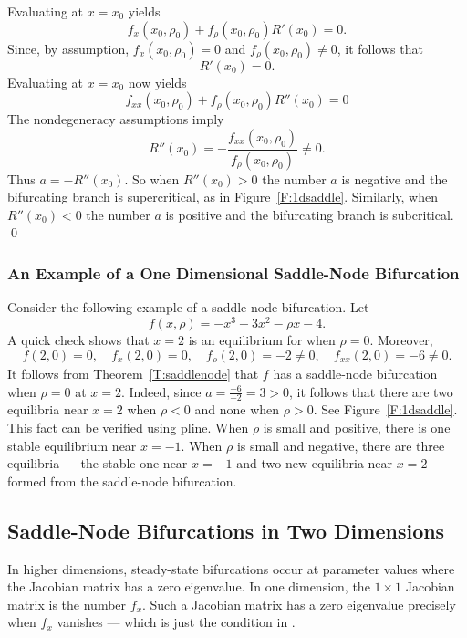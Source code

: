 Evaluating  at $x=x_0$ yields
\[
f_x(x_0,\rho_0) + f_\rho(x_0,\rho_0)R'(x_0) = 0. 
\]
Since, by assumption, $f_x(x_0,\rho_0)=0$ and $f_\rho(x_0,\rho_0)\neq 0$,
it follows that 
\[
R'(x_0)=0.
\]
Evaluating  at $x=x_0$ now yields
\[
f_{xx}(x_0,\rho_0) +  f_\rho(x_0,\rho_0)R''(x_0) = 0
\]
The nondegeneracy assumptions  imply
\[
R''(x_0) = -\frac{f_{xx}(x_0,\rho_0)}{f_\rho(x_0,\rho_0)} \neq 0.
\]
Thus $a=-R''(x_0)$.  So when $R''(x_0)>0$ the number $a$ is negative and the
bifurcating branch is supercritical, as in Figure~\ref{F:1dsaddle}.  Similarly, 
when $R''(x_0)<0$ the number $a$ is positive and the bifurcating branch is 
subcritical. \qed
 
\subsubsection*{An Example of a One Dimensional Saddle-Node Bifurcation}

Consider the following example of a saddle-node bifurcation.  Let 
\begin{equation}  \label{e:sn1}
f(x,\rho) = -x^3 + 3x^2 - \rho x - 4.
\end{equation}
A quick check shows that $x=2$ is an equilibrium for  
when $\rho=0$.  Moreover, 
\[
f(2,0)=0, \quad f_x(2,0)=0, \quad f_\rho(2,0)=-2\neq 0, 
\quad f_{xx}(2,0)=-6\neq 0.
\]
It follows from Theorem~\ref{T:saddlenode} that $f$ has a saddle-node
bifurcation when $\rho=0$ at $x=2$.  Indeed, since $a=\frac{-6}{-2}=3>0$, 
it follows that there are two equilibria near $x=2$ when $\rho<0$ and 
none when $\rho>0$.  See Figure~\ref{F:1dsaddle}. This fact can be 
verified using {\sf pline}.  When $\rho$ is small and positive, there is 
one stable equilibrium near $x=-1$.  When $\rho$ is small and negative, there 
are three equilibria --- the stable one near $x=-1$ and two new equilibria 
near $x=2$ formed from the saddle-node bifurcation.  



\subsection*{Saddle-Node Bifurcations in Two Dimensions}

In higher dimensions, steady-state bifurcations occur at parameter 
values where the Jacobian matrix
has a zero eigenvalue.  In one dimension,
the $1\times 1$ Jacobian matrix is the number $f_x$.  Such a 
Jacobian matrix has a zero eigenvalue precisely when $f_x$ vanishes
--- which is just the condition in .  

